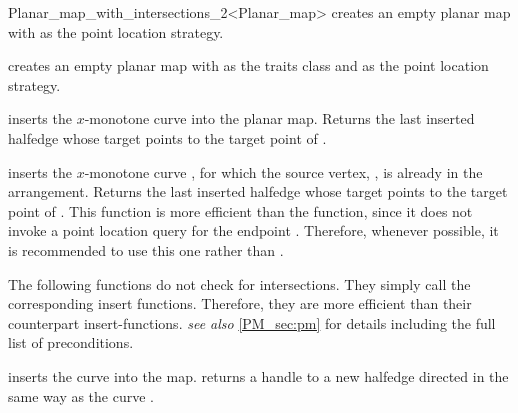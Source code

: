 \begin{ccRefClass}{Planar_map_with_intersections_2<Planar_map>}
  {creates an empty planar map with  as the point location strategy.}

  {creates an empty planar map with  as the traits class and  as the point location strategy.}

\ccOperations

         {inserts the $x$-monotone curve  into the planar map.
	 Returns the last inserted halfedge whose target points to the
	 target point of .
	 }

         {inserts  the $x$-monotone curve , for
	 which the source vertex, , is already in the
	 arrangement.
	 Returns the last inserted halfedge whose target points to the
	 target point of .
	 This function is more efficient than the  function,
	 since it does not invoke a point location query for the
	 endpoint . Therefore,
	 whenever possible, it is recommended to use this one rather
	 than .
	 }

\begin{ccAdvanced}


The following functions do not check for intersections. They simply
call the  corresponding insert functions. Therefore,
they are more efficient than their counterpart insert-functions.
{\em see also} \ref{PM_sec:pm} for details including the full list of
preconditions.

         {inserts the curve  into the
	 map.  returns a handle to a new
	 halfedge directed in the same way as the curve .
	 }


\end{ccAdvanced}
\end{ccRefClass}
